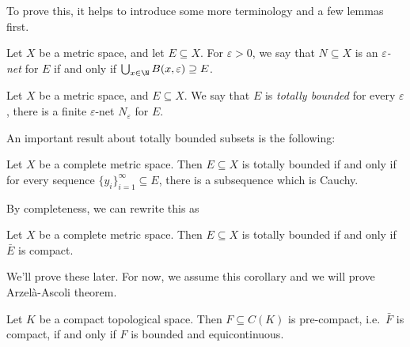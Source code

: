 \documentclass[a4paper]{article}
\begin{document}
To prove this, it helps to introduce some more terminology and a few lemmas first.

\begin{defi}
  Let $X$ be a metric space, and let $E\subseteq X$. For $\varepsilon > 0$, we say that $N \subseteq X$ is an \emph{$\varepsilon$-net} for $E$ if and only if $\bigcup_{x \in \N}B(x, \varepsilon) \supseteq E$.
\end{defi}

\begin{defi}
  Let $X$ be a metric space, and $E\subseteq X$. We say that $E$ is \emph{totally bounded} for every $\varepsilon$, there is a finite $\varepsilon$-net $N_\varepsilon$ for $E$.
\end{defi}

An important result about totally bounded subsets is the following:
\begin{prop}
  Let $X$ be a complete metric space. Then $E\subseteq X$ is totally bounded if and only if for every sequence $\{y_i\}_{i = 1}^\infty \subseteq E$, there is a subsequence which is Cauchy.
\end{prop}

By completeness, we can rewrite this as
\begin{cor}
  Let $X$ be a complete metric space. Then $E\subseteq X$ is totally bounded if and only if $\bar{E}$ is compact.
\end{cor}

We'll prove these later. For now, we assume this corollary and we will prove Arzel\`a-Ascoli theorem.
\begin{thm}
  Let $K$ be a compact topological space. Then $F\subseteq C(K)$ is pre-compact, i.e.\ $\bar{F}$ is compact, if and only if $F$ is bounded and equicontinuous.
\end{thm}
\end{document}
